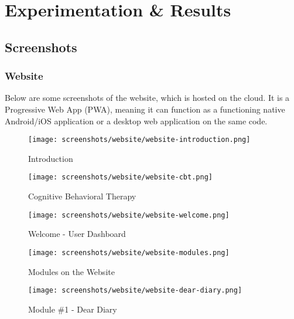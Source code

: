 \chapter{Experimentation \& Results}

\pagebreak

\section{Screenshots}

\subsection{Website}

\noindent
Below are some screenshots of the website, which is hosted on the cloud. It is a Progressive Web App (PWA), meaning it can function as a functioning native Android/iOS application or a desktop web application on the same code.

\vspace*{\fill}
\begin{figure}[H]
    \centering
    \texttt{[image: screenshots/website/website-introduction.png]}
    \caption{Introduction}
\end{figure}
\vspace*{\fill}

\pagebreak

\vspace*{\fill}
\begin{figure}[H]
    \centering
    \texttt{[image: screenshots/website/website-cbt.png]}
    \caption{Cognitive Behavioral Therapy}
\end{figure}

\begin{figure}[H]
    \centering
    \texttt{[image: screenshots/website/website-welcome.png]}
    \caption{Welcome - User Dashboard}
\end{figure}
\vspace*{\fill}

\pagebreak

\vspace*{\fill}
\begin{figure}[H]
    \centering
    \texttt{[image: screenshots/website/website-modules.png]}
    \caption{Modules on the Website}
\end{figure}

\begin{figure}[H]
    \centering
    \texttt{[image: screenshots/website/website-dear-diary.png]}
    \caption{Module \#1 - Dear Diary}
\end{figure}
\vspace*{\fill}

